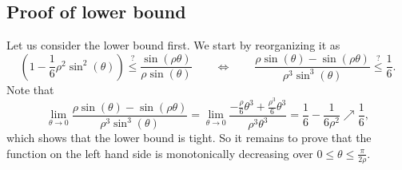 \documentclass[letterpaper,onecolumn,11pt,accepted=2026-02-14]{quantumarticle}
\theoremstyle{remark}
\theoremstyle{plain}
\begin{document}
\subsection{Proof of lower bound}
Let us consider the lower bound first. We start by reorganizing it as
    \begin{equation}
        \left(1-\frac{1}{6}\rho^2\sin^2(\theta)\right)
    \overset{?}{\leq}\frac{\sin(\rho\theta)}{\rho\sin(\theta)}
    \qquad\Leftrightarrow\qquad
    \frac{\rho\sin(\theta)-\sin(\rho\theta)}{\rho^3\sin^3(\theta)}\overset{?}{\leq}\frac{1}{6}.
    \end{equation}
    Note that 
    \begin{equation}
        \lim_{\theta\rightarrow0}\frac{\rho\sin(\theta)-\sin(\rho\theta)}{\rho^3\sin^3(\theta)}
        =\lim_{\theta\rightarrow0}\frac{-\frac{\rho}{6}\theta^3+\frac{\rho^3}{6}\theta^3}{\rho^3\theta^3}
        =\frac{1}{6}-\frac{1}{6\rho^2}\nearrow\frac{1}{6},
    \end{equation}
    which shows that the lower bound is tight.
    So it remains to prove that the function on the left hand side is monotonically decreasing over $0\leq\theta\leq\frac{\pi}{2\rho}$.
\end{document}
